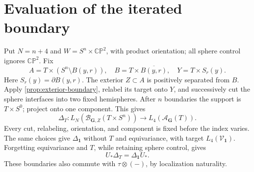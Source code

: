 \documentclass[11pt]{amsart}
\numberwithin{equation}{section}
\theoremstyle{definition}
\theoremstyle{remark}
\newcommand{\CP}{\mathbb {CP}}
\begin{document}
\section{Evaluation of the iterated boundary}\label{bd:scalar}
Put $N=n+4$ and $W=S^n\times\CP^2$, with product orientation;
all sphere control ignores $\CP^2$. Fix
\[
 A=T\times(S^n\setminus B(y,r)),\quad
 B=T\times\overline{B(y,r)},\quad Y=T\times S_r(y).
\]
Here $S_r(y)=\partial B(y,r)$. The exterior $Z\subset A$ is positively separated from $B$.
Apply \cref{prop:exterior-boundary}, relabel its target onto $Y$, and
successively cut the sphere interfaces into two fixed hemispheres.
After $n$ boundaries the support is $T\times S^0$; project onto one
component. This gives
\begin{equation}\label{bd:Delta}
 \Delta_T:L_N(\mathcal B_{\mathbf G,Z}(T\times S^n))
       \longrightarrow L_4(\mathcal A_{\mathbf G}(T)).
\end{equation}
Every cut, relabeling, orientation, and component is fixed before the
index varies. The same choices give $\Delta_{\mathbf1}$ without $T$
and equivariance, with target $L_4(\mathcal V_{\mathbf1})$.
Forgetting equivariance and $T$, while retaining sphere control, gives
\begin{equation}\label{bd:naturality}
 U_*\Delta_T=\Delta_{\mathbf1}U_*.
\end{equation}
These boundaries also commute with $\tau\otimes(-)$, by localization
naturality.
\end{document}
